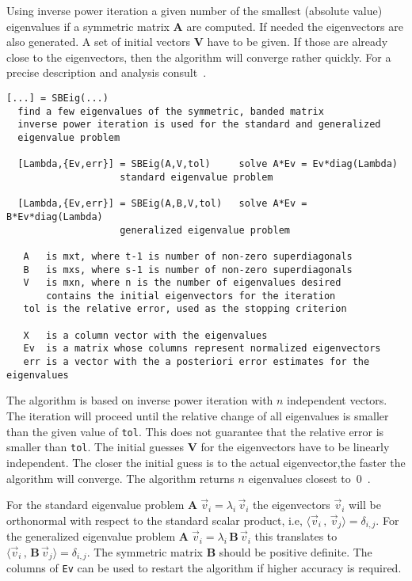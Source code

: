 \documentclass[11pt]{article}
\begin{document}
Using inverse power iteration a given number of the smallest (absolute value)
eigenvalues if a symmetric matrix \textbf{A} are computed. If needed the
eigenvectors are also generated.  A set of initial vectors \textbf{V} have to
be given. If those are already close to the eigenvectors, then the algorithm
will converge rather quickly. For a precise description and analysis
consult~\cite{GoluVanLoan96}.
\begin{verbatim}
[...] = SBEig(...)
  find a few eigenvalues of the symmetric, banded matrix
  inverse power iteration is used for the standard and generalized
  eigenvalue problem

  [Lambda,{Ev,err}] = SBEig(A,V,tol)     solve A*Ev = Ev*diag(Lambda)
                    standard eigenvalue problem

  [Lambda,{Ev,err}] = SBEig(A,B,V,tol)   solve A*Ev = B*Ev*diag(Lambda)
                    generalized eigenvalue problem

   A   is mxt, where t-1 is number of non-zero superdiagonals
   B   is mxs, where s-1 is number of non-zero superdiagonals
   V   is mxn, where n is the number of eigenvalues desired
       contains the initial eigenvectors for the iteration
   tol is the relative error, used as the stopping criterion

   X   is a column vector with the eigenvalues
   Ev  is a matrix whose columns represent normalized eigenvectors
   err is a vector with the a posteriori error estimates for the eigenvalues
\end{verbatim}

The algorithm is based on inverse power iteration 
  with $n$ independent vectors.
The iteration will proceed until the relative change of all eigenvalues is
smaller than the given value of \texttt{tol}. This does not guarantee that the
relative error is smaller than \texttt{tol}.  The initial guesses \textbf{V}
for the eigenvectors have to be linearly independent. The closer the initial
guess is to the actual eigenvector,the faster the algorithm will converge. 
The algorithm returns $n$ eigenvalues closest to~0~.


For the standard eigenvalue problem $\mathbf{A}\;\vec v_i = \lambda_i\, \vec
v_i$ the eigenvectors $\vec v_i$ will be orthonormal with respect to the
standard scalar product, i.e, $\langle \vec v_i\,,\,\vec v_j\rangle
=\delta_{i,j}$. For the generalized eigenvalue problem 
$\mathbf{A}\;\vec v_i = \lambda_i\, \mathbf{B}\,\vec v_i$ this translates to
$\langle \vec v_i\,,\,\mathbf{B}\,\vec v_j\rangle=\delta_{i,j}$. The symmetric
matrix \textbf{B} should be positive definite. The columns of \texttt{Ev} can
be used to restart the algorithm if higher accuracy is required.
\end{document}
